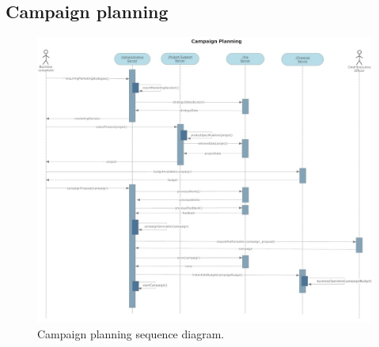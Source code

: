 \subsection{Campaign planning}
\begin{figure}[H]
\begin{centering}
\includegraphics[scale=0.35,angle=90]{assign3/sdraw/imgs/campaign_planning.jpg}
\caption{Campaign planning sequence diagram.}
\label{3img:[sequence]campaign_planning}
\end{centering}
\end{figure}
